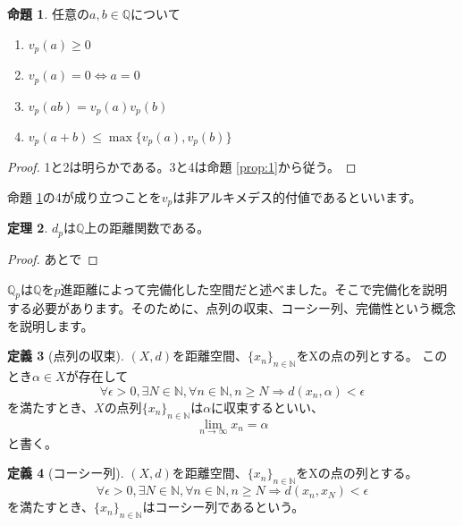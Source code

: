 \documentclass[uplatex]{jsarticle}
\newcommand{\Q}{\mathbb{Q}}
\theoremstyle{definition} %
\newtheorem{thm}{定理}
\newtheorem{defi}[thm]{定義}
\newtheorem{prop}[thm]{命題}
\begin{document}
\begin{oframed}\begin{prop}\label{prop:2}
任意の$a, b \in \Q$について
\begin{enumerate}
\item $v_p(a) \geq 0$
\item $v_p(a) = 0 \iff a = 0$
\item $v_p(ab) = v_p(a) v_p(b)$
\item $v_p(a+b) \leq \max\{v_p(a), v_p(b)\}$
\end{enumerate}
\end{prop}\end{oframed}
\begin{proof}
1と2は明らかである。3と4は命題 \ref{prop:1}から従う。
\end{proof}

命題 \ref{prop:2}の4が成り立つことを$v_p$は非アルキメデス的付値であるといいます。

\begin{oframed}\begin{thm}
$d_p$は$\Q$上の距離関数である。
\end{thm}\end{oframed}
\begin{proof}
あとで
\end{proof}

$\Q_p$は$\Q$を$p$進距離によって完備化した空間だと述べました。そこで完備化を説明する必要があります。そのために、点列の収束、コーシー列、完備性という概念を説明します。

\begin{oframed}\begin{defi}[点列の収束]
$(X, d)$を距離空間、$\{x_n\}_{n\in\mathbb{N}}$をXの点の列とする。
このとき$\alpha \in X$が存在して
\[
\forall \epsilon>0, \exists N\in\mathbb{N}, \forall n \in \mathbb{N}, n \geq N \Rightarrow d(x_n, \alpha) < \epsilon
\]
を満たすとき、$X$の点列$\{x_n\}_{n\in\mathbb{N}}$は$\alpha$に収束するといい、
\[
\lim_{n \to \infty} x_n = \alpha
\]
と書く。
\end{defi}\end{oframed}

\begin{oframed}\begin{defi}[コーシー列]
$(X, d)$を距離空間、$\{x_n\}_{n\in\mathbb{N}}$をXの点の列とする。
\[
\forall \epsilon>0, \exists N\in\mathbb{N}, \forall n \in \mathbb{N}, n \geq N \Rightarrow d(x_n, x_N) < \epsilon
\]
を満たすとき、$\{x_n\}_{n\in\mathbb{N}}$はコーシー列であるという。
\end{defi}\end{oframed}
\end{document}
